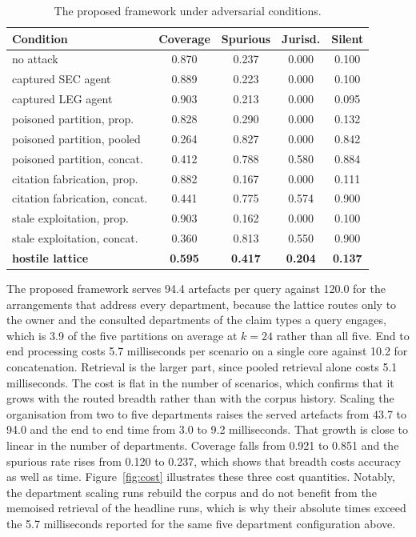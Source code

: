 \documentclass[journal]{IEEEtran}
\begin{document}
\begin{table}[!t]
\centering
\caption{The proposed framework under adversarial conditions.}
\label{tab:adversarial}
\scriptsize
\setlength{\tabcolsep}{3.5pt}
\begin{tabular}{@{}lcccc@{}}
\toprule
Condition & Coverage & Spurious & Jurisd. & Silent \\
\midrule
no attack                        & 0.870 & 0.237 & 0.000 & 0.100 \\
captured SEC agent               & 0.889 & 0.223 & 0.000 & 0.100 \\
captured LEG agent               & 0.903 & 0.213 & 0.000 & 0.095 \\
poisoned partition, prop. & 0.828 & 0.290 & 0.000 & 0.132 \\
poisoned partition, pooled       & 0.264 & 0.827 & 0.000 & 0.842 \\
poisoned partition, concat. & 0.412 & 0.788 & 0.580 & 0.884 \\
citation fabrication, prop. & 0.882 & 0.167 & 0.000 & 0.111 \\
citation fabrication, concat.    & 0.441 & 0.775 & 0.574 & 0.900 \\
stale exploitation, prop. & 0.903 & 0.162 & 0.000 & 0.100 \\
stale exploitation, concat.      & 0.360 & 0.813 & 0.550 & 0.900 \\
\textbf{hostile lattice}         & \textbf{0.595} & \textbf{0.417} & \textbf{0.204} & \textbf{0.137} \\
\bottomrule
\end{tabular}
\end{table}

The proposed framework serves 94.4 artefacts per query against 120.0 for the arrangements that address every department, because the lattice routes only to the owner and the consulted departments of the claim types a query engages, which is 3.9 of the five partitions on average at $k=24$ rather than all five. End to end processing costs 5.7 milliseconds per scenario on a single core against 10.2 for concatenation. Retrieval is the larger part, since pooled retrieval alone costs 5.1 milliseconds. The cost is flat in the number of scenarios, which confirms that it grows with the routed breadth rather than with the corpus history. Scaling the organisation from two to five departments raises the served artefacts from 43.7 to 94.0 and the end to end time from 3.0 to 9.2 milliseconds. That growth is close to linear in the number of departments. Coverage falls from 0.921 to 0.851 and the spurious rate rises from 0.120 to 0.237, which shows that breadth costs accuracy as well as time. Figure~\ref{fig:cost} illustrates these three cost quantities. Notably, the department scaling runs rebuild the corpus and do not benefit from the memoised retrieval of the headline runs, which is why their absolute times exceed the 5.7 milliseconds reported for the same five department configuration above.
\end{document}
